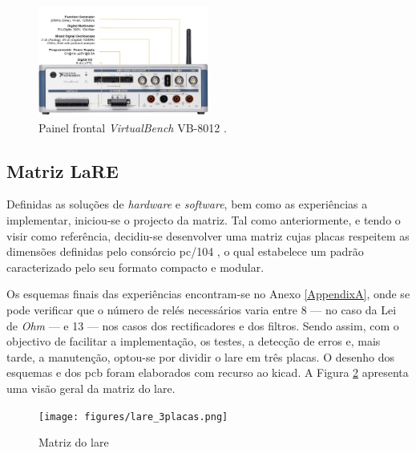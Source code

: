 \begin{figure}[hbtp]
    \centering
    \includegraphics[width=0.5\textwidth]{figures/virtualbench_front-panel.jpg}
    \caption{Painel frontal \textit{VirtualBench} VB-8012  \cite{datasheetVirtualBench}.}
    \label{fig:paineldianteiro}
\end{figure}


\subsection{Matriz LaRE}
\label{sec:matriz}
Definidas as soluções de \textit{hardware} e \textit{software}, bem como as experiências a implementar, iniciou-se o projecto da matriz. Tal como anteriormente, e tendo o \acrshort{visir} como referência, decidiu-se desenvolver uma matriz cujas placas respeitem as dimensões definidas pelo consórcio \gls{pc/104} \cite{PC104}, o qual estabelece um padrão caracterizado pelo seu formato compacto e modular.

Os esquemas finais das experiências encontram-se no Anexo \ref{AppendixA}, onde se pode verificar que o número de relés necessários varia entre 8 — no caso da Lei de \textit{Ohm} — e 13 — nos casos dos rectificadores e dos filtros. Sendo assim, com o objectivo de facilitar a implementação, os testes, a detecção de erros e, mais tarde, a manutenção, optou-se por dividir o \acrshort{lare} em três placas. O desenho dos esquemas e dos \acrfull{pcb} foram elaborados com recurso ao \gls{kicad}. A Figura \ref{fig:matrizlare} apresenta uma visão geral da matriz do \acrshort{lare}. 

\begin{figure}[hbtp]
	\centering
	\texttt{[image: figures/lare\_3placas.png]}
	\caption{Matriz do \acrshort{lare}}
	\label{fig:matrizlare}
\end{figure}

